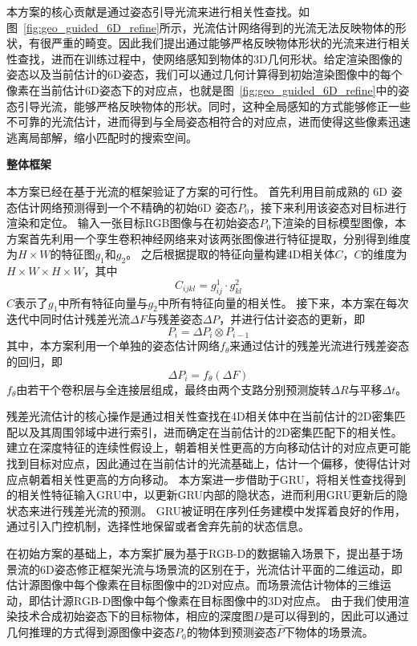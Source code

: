 \documentclass[12pt]{article}
\begin{document}
本方案的核心贡献是通过姿态引导光流来进行相关性查找。如图~\ref{fig:geo_guided_6D_refine}所示，光流估计网络得到的光流无法反映物体的形状，有很严重的畸变。因此我们提出通过能够严格反映物体形状的光流来进行相关性查找，进而在训练过程中，使网络感知到物体的3D几何形状。给定渲染图像的姿态以及当前估计的6D姿态，我们可以通过几何计算得到初始渲染图像中的每个像素在当前估计6D姿态下的对应点，也就是图~\ref{fig:geo_guided_6D_refine}中的姿态引导光流，能够严格反映物体的形状。同时，这种全局感知的方式能够修正一些不可靠的光流估计，进而得到与全局姿态相符合的对应点，进而使得这些像素迅速逃离局部解，缩小匹配时的搜索空间。

\textbf{整体框架}

本方案已经在基于光流的框架验证了方案的可行性。
首先利用目前成熟的 6D 姿态估计网络预测得到一个不精确的初始6D 姿态$P_0$，接下来利用该姿态对目标进行渲染和定位。
输入一张目标RGB图像与在初始姿态$P_0$下渲染的目标模型图像，本方案首先利用一个孪生卷积神经网络来对该两张图像进行特征提取，分别得到维度为$H\times W$的特征图$g_1$和$g_2$。
之后根据提取的特征向量构建4D相关体$C$，$C$的维度为$H\times W \times H \times W$，其中
\begin{equation}
    C_{ijkl} = g^1_{ij} \cdot g^2_{kl}
\end{equation}
$C$表示了$g_1$中所有特征向量与$g_2$中所有特征向量的相关性。
接下来，本方案在每次迭代中同时估计残差光流$\Delta F$与残差姿态$\Delta P$，并进行估计姿态的更新，即
\begin{equation}
    P_i = \Delta P_i \otimes P_{i-1}
\end{equation}
其中，本方案利用一个单独的姿态估计网络$f_{\theta}$来通过估计的残差光流进行残差姿态的回归，即
\begin{equation}
    \Delta P_i = f_{\theta}(\Delta F)
\end{equation}
$f_\theta$由若干个卷积层与全连接层组成，最终由两个支路分别预测旋转$\Delta R$与平移$\Delta t$。


残差光流估计的核心操作是通过相关性查找在4D相关体中在当前估计的2D密集匹配以及其周围邻域中进行索引，进而确定在当前估计的2D密集匹配下的相关性。
建立在深度特征的连续性假设上，朝着相关性更高的方向移动估计的对应点更可能找到目标对应点，因此通过在当前估计的光流基础上，估计一个偏移，使得估计对应点朝着相关性更高的方向移动。
本方案进一步借助于GRU，将相关性查找得到的相关性特征输入GRU中，以更新GRU内部的隐状态，进而利用GRU更新后的隐状态来进行残差光流的预测。
GRU被证明在序列任务建模中发挥着良好的作用，通过引入门控机制，选择性地保留或者舍弃先前的状态信息。

在初始方案的基础上，本方案扩展为基于RGB-D的数据输入场景下，提出基于场景流的6D姿态修正框架光流与场景流的区别在于，光流估计平面的二维运动，即估计源图像中每个像素在目标图像中的2D对应点。而场景流估计物体的三维运动，即估计源RGB-D图像中每个像素在目标图像中的3D对应点。
由于我们使用渲染技术合成初始姿态下的目标物体，相应的深度图$D$是可以得到的，因此可以通过几何推理的方式得到源图像中姿态$P_0$的物体到预测姿态$\hat{P}$下物体的场景流。
\end{document}
